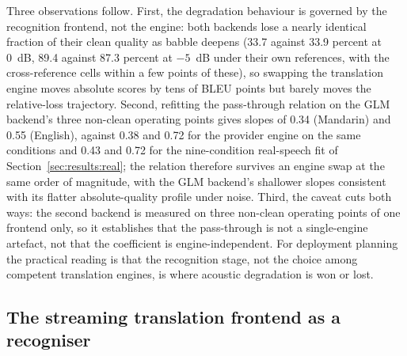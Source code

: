 Three observations follow. First, the degradation behaviour is governed by
the recognition frontend, not the engine: both backends lose a nearly
identical fraction of their clean quality as babble deepens (33.7 against
33.9 percent at 0~dB, 89.4 against 87.3 percent at $-5$~dB under their own
references, with the cross-reference cells within a few points of these),
so swapping the translation engine moves absolute scores by tens of BLEU
points but barely moves the relative-loss trajectory. Second, refitting
the pass-through relation on the GLM backend's three non-clean operating
points gives slopes of 0.34 (Mandarin) and 0.55 (English), against 0.38 and
0.72 for the provider engine on the same conditions and 0.43 and 0.72 for
the nine-condition real-speech fit of
Section~\ref{sec:results:real}; the relation therefore survives an engine
swap at the same order of magnitude, with the GLM backend's shallower
slopes consistent with its flatter absolute-quality profile under noise.
Third, the caveat cuts both ways: the second backend is measured on three
non-clean operating points of one frontend only, so it establishes that
the pass-through is not a single-engine artefact, not that the coefficient
is engine-independent. For deployment planning the practical reading is
that the recognition stage, not the choice among competent translation
engines, is where acoustic degradation is won or lost.

\subsection{The streaming translation frontend as a recogniser}
\label{sec:results:frontend}

